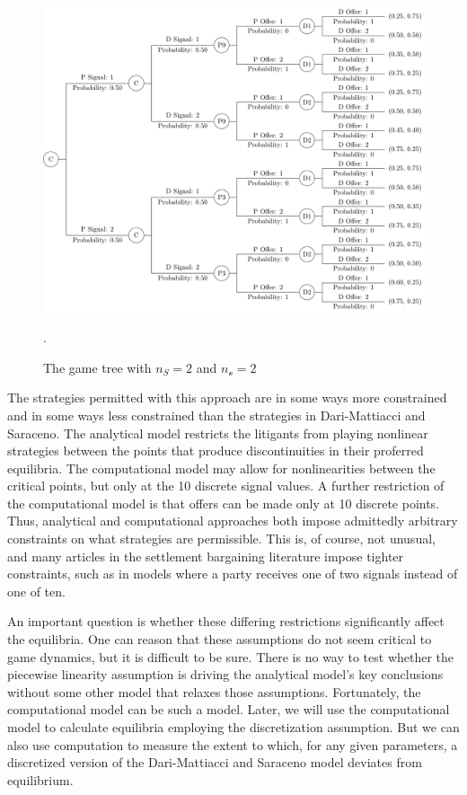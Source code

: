 \documentclass{article}
\begin{document}
\begin{figure}[h!]
\centering
\includegraphics[scale=0.50, trim={0in 0in 0in 0in}, clip]{../Figures/gametree.pdf}
\caption{The game tree with $n_S=2$ and $n_{\mathcal{o}}=2$}. 
\label{fig:gametree}
\end{figure}

The strategies permitted with this approach are in some ways more constrained and in some ways less constrained than the strategies in Dari-Mattiacci and Saraceno. The analytical model restricts the litigants from playing nonlinear strategies between the points that produce discontinuities in their proferred equilibria. The computational model may allow for nonlinearities between the critical points, but only at the 10 discrete signal values. A further restriction of the computational model is that offers can be made only at 10 discrete points. Thus, analytical and computational approaches both impose admittedly arbitrary constraints on what strategies are permissible. This is, of course, not unusual, and many articles in the settlement bargaining literature impose tighter constraints, such as in models where a party receives one of two signals instead of one of ten. 

An important question is whether these differing restrictions significantly affect the equilibria. One can reason that these assumptions do not seem critical to game dynamics, but it is difficult to be sure. There is no way to test whether the piecewise linearity assumption is driving the analytical model's key conclusions without some other model that relaxes those assumptions. Fortunately, the computational model can be such a model. Later, we will use the computational model to calculate equilibria employing the discretization assumption. But we can also use computation to measure the extent to which, for any given parameters, a discretized version of the Dari-Mattiacci and Saraceno model deviates from equilibrium. 
\end{document}
